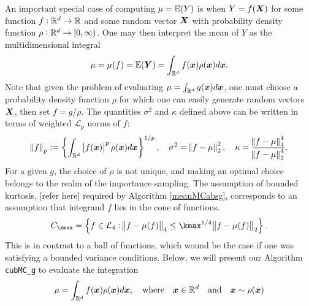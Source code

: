 \documentclass{iitthesis}
\begin{document}
\label{chapter:cubMCg}
An important special case of computing $\mu =\mathbb{E}(Y)$ is when $Y = f(\boldsymbol{X})$ for some function $f:\mathbb{R}^d \to \mathbb{R}$ and some random vector $\boldsymbol{X}$ with probability density function $\rho: \mathbb{R}^d \to [0,\infty)$. One may then interpret the mean of $Y$ as the multidimensional integral
\begin{align*}
\mu = \mu(f) = \mathbb{E}(\boldsymbol{Y}) = \int_{\mathbb{R}^d}f(\boldsymbol{x})\rho(\boldsymbol{x})d\boldsymbol{x}.
\end{align*}
Note that given the problem of evaluating $\mu = \int_{\mathbb{R}^d}g(\boldsymbol{x})d\boldsymbol{x}$, one must choose a probability density function $\rho$ for which one can easily generate random vectors $\boldsymbol{X}$, then set $f = g/\rho$. The quantities $\sigma^2$ and $\kappa$ defined above can be written in terms of weighted $\mathcal{L}_p$ norms of $f$:
\begin{align}
\norm{f}_p:=\left\{ \int_{\mathbb{R}^d}\left \lvert f(\boldsymbol{x}) \right \rvert^p\rho(\boldsymbol{x})d\boldsymbol{x}\right\}^{1/p}, \quad \sigma^2 = \norm{f-\mu}_2^2,\quad \kappa = \frac{\norm{f-\mu}_4^4}{\norm{f-\mu}_2^4}.
\end{align}
For a given $g$, the choice of $\rho$ is not unique, and making an optimal choice belongs to the realm of the importance sampling. The assumption of bounded kurtosis, [refer here] required by Algorithm \ref{meanMCabsg}, corresponds to an assumption that integrand $f$ lies in the cone of functions.
\begin{align}
C_{\kmax} = \left\{ f \in \mathcal{L}_4: \norm{f-\mu(f)}_4 \leq \kmax^{1/4} \norm{f-\mu(f)}_2\right\}.
\end{align}
This is in contrast to a ball of functions, which wound be the case if one was satisfying a bounded variance conditions.
Below, we will present our Algorithm {\tt cubMC\_g} to evaluate the integration
$$\mu = \int_{\mathbb{R}^d} f(\boldsymbol{x})\rho(\boldsymbol{x})d\boldsymbol{x}, \quad \text{where}\quad \boldsymbol{x} \in \mathbb{R}^d \quad \text{and}\quad  \boldsymbol{x} \sim \rho(\boldsymbol{x})$$
\end{document}
